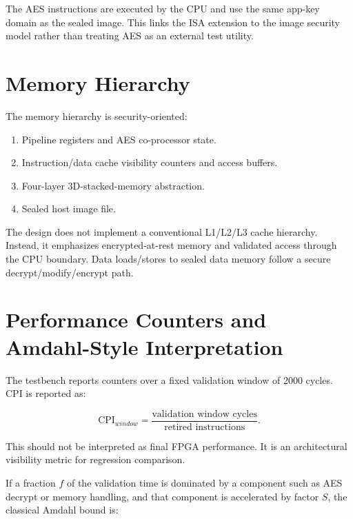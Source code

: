 \documentclass[conference]{IEEEtran}
\begin{document}
The AES instructions are executed by the CPU and use the same app-key domain as the sealed image. This links the ISA extension to the image security model rather than treating AES as an external test utility.

\section{Memory Hierarchy}

The memory hierarchy is security-oriented:

\begin{enumerate}
    \item Pipeline registers and AES co-processor state.
    \item Instruction/data cache visibility counters and access buffers.
    \item Four-layer 3D-stacked-memory abstraction.
    \item Sealed host image file.
\end{enumerate}

The design does not implement a conventional L1/L2/L3 cache hierarchy. Instead, it emphasizes encrypted-at-rest memory and validated access through the CPU boundary. Data loads/stores to sealed data memory follow a secure decrypt/modify/encrypt path.

\section{Performance Counters and Amdahl-Style Interpretation}

The testbench reports counters over a fixed validation window of 2000 cycles. CPI is reported as:

\begin{equation}
\text{CPI}_{window}=\frac{\text{validation window cycles}}{\text{retired instructions}}.
\end{equation}

This should not be interpreted as final FPGA performance. It is an architectural visibility metric for regression comparison.

If a fraction $f$ of the validation time is dominated by a component such as AES decrypt or memory handling, and that component is accelerated by factor $S$, the classical Amdahl bound is:
\end{document}
